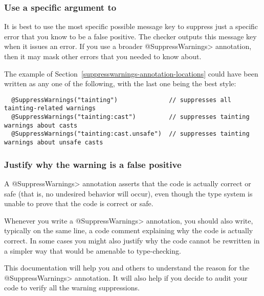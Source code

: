 \subsubsection{Use a specific argument to \label{suppresswarnings-best-practices-specific-argument}}


\label{compiler-message-keys}

It is best to use the most specific possible message key to suppress just a
specific error that you know to be a false positive.  The checker outputs
this message key when it issues an error.  If you use a broader
\<@SuppressWarnings> annotation, then it may mask other errors that you
needed to know about.

The example of Section~\ref{suppresswarnings-annotation-locations} could
have been written as any one of the following, with the last one being the
best style:

\begin{Verbatim}
  @SuppressWarnings("tainting")              // suppresses all tainting-related warnings
  @SuppressWarnings("tainting:cast")         // suppresses tainting warnings about casts
  @SuppressWarnings("tainting:cast.unsafe")  // suppresses tainting warnings about unsafe casts
\end{Verbatim}





\subsubsection{Justify why the warning is a false positive\label{suppresswarnings-best-practices-justification}}

A \<@SuppressWarnings> annotation asserts that the code is actually
correct or safe (that is, no undesired behavior will occur), even though
the type system is unable to prove that the code is correct or safe.

Whenever you write a \<@SuppressWarnings> annotation, you should also
write, typically on the same line, a code comment
explaining why the code is actually correct.  In some cases you might also
justify why the code cannot be rewritten in a simpler way that would be
amenable to type-checking.

This documentation will help you and others to understand the reason for
the \<@SuppressWarnings> annotation.  It will also help if you decide to
audit your code to verify all the warning suppressions.


